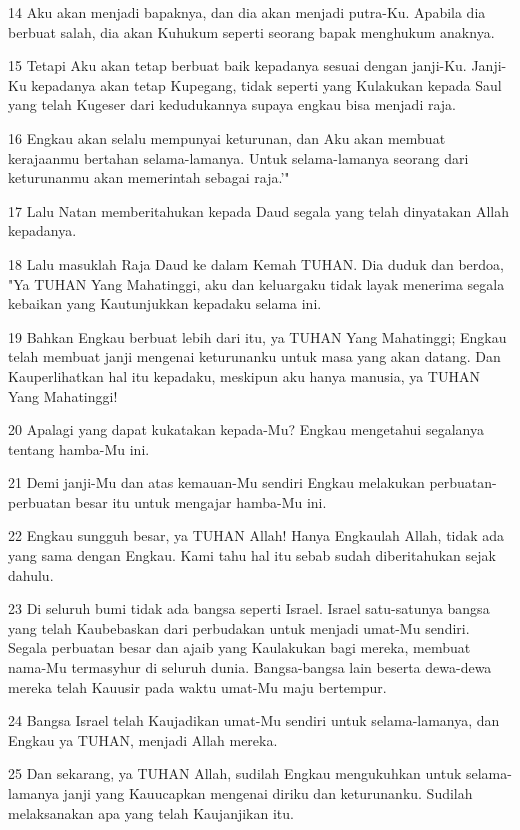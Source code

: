 \par 14 Aku akan menjadi bapaknya, dan dia akan menjadi putra-Ku. Apabila dia berbuat salah, dia akan Kuhukum seperti seorang bapak menghukum anaknya.
\par 15 Tetapi Aku akan tetap berbuat baik kepadanya sesuai dengan janji-Ku. Janji-Ku kepadanya akan tetap Kupegang, tidak seperti yang Kulakukan kepada Saul yang telah Kugeser dari kedudukannya supaya engkau bisa menjadi raja.
\par 16 Engkau akan selalu mempunyai keturunan, dan Aku akan membuat kerajaanmu bertahan selama-lamanya. Untuk selama-lamanya seorang dari keturunanmu akan memerintah sebagai raja.'"
\par 17 Lalu Natan memberitahukan kepada Daud segala yang telah dinyatakan Allah kepadanya.
\par 18 Lalu masuklah Raja Daud ke dalam Kemah TUHAN. Dia duduk dan berdoa, "Ya TUHAN Yang Mahatinggi, aku dan keluargaku tidak layak menerima segala kebaikan yang Kautunjukkan kepadaku selama ini.
\par 19 Bahkan Engkau berbuat lebih dari itu, ya TUHAN Yang Mahatinggi; Engkau telah membuat janji mengenai keturunanku untuk masa yang akan datang. Dan Kauperlihatkan hal itu kepadaku, meskipun aku hanya manusia, ya TUHAN Yang Mahatinggi!
\par 20 Apalagi yang dapat kukatakan kepada-Mu? Engkau mengetahui segalanya tentang hamba-Mu ini.
\par 21 Demi janji-Mu dan atas kemauan-Mu sendiri Engkau melakukan perbuatan-perbuatan besar itu untuk mengajar hamba-Mu ini.
\par 22 Engkau sungguh besar, ya TUHAN Allah! Hanya Engkaulah Allah, tidak ada yang sama dengan Engkau. Kami tahu hal itu sebab sudah diberitahukan sejak dahulu.
\par 23 Di seluruh bumi tidak ada bangsa seperti Israel. Israel satu-satunya bangsa yang telah Kaubebaskan dari perbudakan untuk menjadi umat-Mu sendiri. Segala perbuatan besar dan ajaib yang Kaulakukan bagi mereka, membuat nama-Mu termasyhur di seluruh dunia. Bangsa-bangsa lain beserta dewa-dewa mereka telah Kauusir pada waktu umat-Mu maju bertempur.
\par 24 Bangsa Israel telah Kaujadikan umat-Mu sendiri untuk selama-lamanya, dan Engkau ya TUHAN, menjadi Allah mereka.
\par 25 Dan sekarang, ya TUHAN Allah, sudilah Engkau mengukuhkan untuk selama-lamanya janji yang Kauucapkan mengenai diriku dan keturunanku. Sudilah melaksanakan apa yang telah Kaujanjikan itu.
